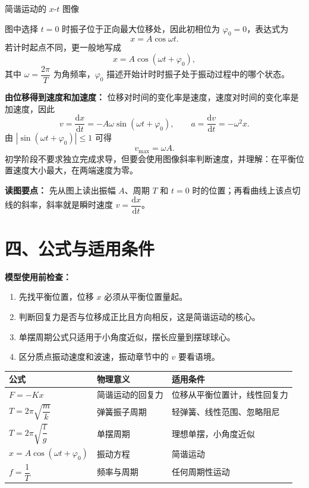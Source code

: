 \begin{conceptbox}{简谐运动的 $x$-$t$ 图像}

\begin{center}


\label{fig:sh-motion-graph}
\end{center}

图中选择 $t=0$ 时振子位于正向最大位移处，因此初相位为 $\varphi_0=0$，表达式为
\[
x=A\cos\omega t.
\]
若计时起点不同，更一般地写成
\[
x=A\cos(\omega t+\varphi_0),
\]
其中 $\omega=\dfrac{2\pi}{T}$ 为角频率，$\varphi_0$ 描述开始计时时振子处于振动过程中的哪个状态。

\textbf{由位移得到速度和加速度：} 位移对时间的变化率是速度，速度对时间的变化率是加速度，因此
\[
v=\frac{\mathrm dx}{\mathrm dt}
  =-A\omega\sin(\omega t+\varphi_0),\qquad
a=\frac{\mathrm dv}{\mathrm dt}
  =-\omega^2x.
\]
由 $|\sin(\omega t+\varphi_0)|\leqslant 1$ 可得
\[
\boxed{v_{\max}=\omega A}.
\]
初学阶段不要求独立完成求导，但要会使用图像斜率判断速度，并理解：在平衡位置速度大小最大，在两端速度为零。

\textbf{读图要点：} 先从图上读出振幅 $A$、周期 $T$ 和 $t=0$ 时的位置；再看曲线上该点切线的斜率，斜率就是瞬时速度 $v=\dfrac{\mathrm dx}{\mathrm dt}$。

\end{conceptbox}

\section*{四、公式与适用条件}

\textbf{模型使用前检查：}
\begin{enumerate}
  \item 先找平衡位置，位移 $x$ 必须从平衡位置量起。
  \item 判断回复力是否与位移成正比且方向相反，这是简谐运动的核心。
  \item 单摆周期公式只适用于小角度近似，摆长应量到摆球球心。
  \item 区分质点振动速度和波速，振动章节中的 $v$ 要看语境。
\end{enumerate}

\begin{center}
\begin{tabular}{lll}
\toprule
公式 & 物理意义 & 适用条件 \\
\midrule
$F = -Kx$ & 简谐运动的回复力 & 位移从平衡位置计，线性回复力 \\
$T = 2\pi\sqrt{\dfrac{m}{k}}$ & 弹簧振子周期 & 轻弹簧、线性范围、忽略阻尼 \\
$T = 2\pi\sqrt{\dfrac{l}{g}}$ & 单摆周期 & 理想单摆，小角度近似 \\
$x = A\cos(\omega t + \varphi_0)$ & 振动方程 & 简谐运动 \\
$f = \dfrac{1}{T}$ & 频率与周期 & 任何周期性运动 \\
\bottomrule
\end{tabular}
\end{center}

